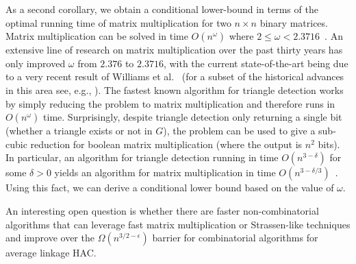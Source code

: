 \documentclass[11pt]{article}
\begin{document}
As a second corollary, we obtain a conditional lower-bound in terms of the optimal running time of matrix multiplication for two $n \times n$ binary matrices. 
Matrix multiplication can be solved in time $O(n^{\omega})$ where $2 \leq \omega < 2.3716$~\cite{williams2024new}. 
An extensive line of research on matrix multiplication over the past thirty years has only improved $\omega$ from $2.376$ to $2.3716$, with the current state-of-the-art being due to a very recent result of Williams et al.~\cite{williams2024new} (for a subset of the historical advances in this area see, e.g., \cite{coppersmith1982asymptotic, le2012faster, alman2021refined, williams2012multiplying}).
The fastest known algorithm for triangle detection works by simply reducing the problem to matrix multiplication and therefore runs in $O(n^{\omega})$ time.
Surprisingly, despite triangle detection only returning a single bit (whether a triangle exists or not in $G$), the problem can be used to give a sub-cubic reduction for boolean matrix multiplication (where the output is $n^2$ bits).
In particular, an algorithm for triangle detection running in time $O(n^{3-\delta})$ for some $\delta > 0$ yields an algorithm for matrix multiplication in time $O(n^{3-\delta/3})$~\cite{williams2010subcubic}.
Using this fact, we can derive a conditional lower bound based on the value of $\omega$.

\workmatmul*




An interesting open question is whether there are faster non-combinatorial algorithms that can leverage fast matrix multiplication or Strassen-like techniques and improve over the $\Omega(n^{3/2 - \epsilon})$ barrier for combinatorial algorithms for average linkage HAC.
\end{document}
